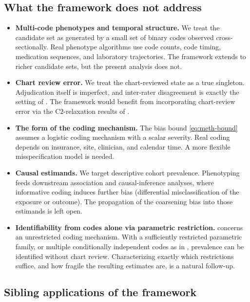 \subsection{What the framework does not address}

\begin{itemize}
\item \textbf{Multi-code phenotypes and temporal structure.} We treat
  the candidate set as generated by a small set of binary codes
  observed cross-sectionally. Real phenotype algorithms use code counts,
  code timing, medication sequences, and laboratory trajectories. The
  framework extends to richer candidate sets, but the present analysis
  does not.

\item \textbf{Chart review error.} We treat the chart-reviewed state as
  a true singleton. Adjudication itself is imperfect, and inter-rater
  disagreement is exactly the setting of \citet{dawid1979maximum}. The
  framework would benefit from incorporating chart-review error via the
  C2-relaxation results of \citet{towell2026mdrelax}.

\item \textbf{The form of the coding mechanism.} The bias bound
  \eqref{eq:meth-bound} assumes a logistic coding mechanism with a
  scalar severity. Real coding depends on insurance, site, clinician,
  and calendar time. A more flexible misspecification model is needed.

\item \textbf{Causal estimands.} We target descriptive cohort
  prevalence. Phenotyping feeds downstream association and
  causal-inference analyses, where informative coding induces further
  bias (differential misclassification of the exposure or outcome). The
  propagation of the coarsening bias into those estimands is left open.

\item \textbf{Identifiability from codes alone via parametric
  restriction.}  concerns an unrestricted
  coding mechanism. With a sufficiently restricted parametric family,
  or multiple conditionally independent codes as in
  \citet{hui1980estimating}, prevalence can be identified without chart
  review. Characterizing exactly which restrictions suffice, and how
  fragile the resulting estimates are, is a natural follow-up.
\end{itemize}

\subsection{Sibling applications of the framework}

